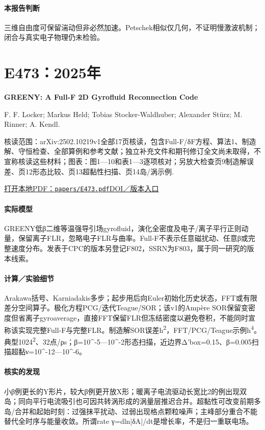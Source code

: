 \paragraph{本报告判断}三维自由度可保留湍动但非必然加速。Petschek相似仅几何，不证明慢激波机制；闭合与真实电子物理仍未检验。

\section{E473：2025年}\label{paper:E473}

\textbf{GREENY: A Full-F 2D Gyrofluid Reconnection Code}\citep{E473}\

F. F. Locker;  Markus Held;  Tobias Stocker-Waldhuber;  Alexander Stürz;  M. Rinner;  A. Kendl.

\textsf{核读范围：}arXiv:2502.10219v1全部17页核读，包含Full-F/δF方程、算法1、制造解、守恒检查、全部算例和参考文献；独立补充文件和期刊修订全文尚未取得，不宣称核读这些材料；\textsf{图表：}图1—10和表1—3逐项核对；另放大检查页9制造解误差、页12形态比较、页13超黏性扫描、页14岛/涡示例.

\href{run:papers/E473.pdf}{打开本地PDF：\texttt{papers/E473.pdf}}\quad\href{https://doi.org/10.1016/j.cpc.2025.109807}{DOI／版本入口}

\paragraph{实际模型}GREENY低β二维等温强导引场gyrofluid，演化全密度及电子/离子平行正则动量，保留离子FLR，忽略电子FLR与曲率。Full-F不表示任意磁扰动、任意β或完整速度分布。发表于CPC的版本另登记F802，SSRN为F803，属于同一研究的版本线索。

\paragraph{计算／实验细节}Arakawa括号、Karniadakis多步；起步用后向Euler初始化历史状态，FFT或有限差分空间算子。极化方程PCG/迭代Teague/SOR；该v1的Ampère SOR保留变密度但省离子gyroaverage，直接FFT保留FLR但冻结密度以避免卷积，不能同时宣称该实现完整Full-F与完整FLR。制造解SOR误差h\textsuperscript{2}，FFT/PCG/Teague示例h\textsuperscript{4}。典型1024\textsuperscript{2}、32点/ρs；β=10\textasciicircum{}-5—10\textasciicircum{}-2形态扫描，近边界Δ'box=0.15、β=0.005扫描超黏ν=10\textasciicircum{}-12—10\textasciicircum{}-6。

\paragraph{核实的发现}小β例更长的Y形片，较大β例更开放X形；暖离子电流驱动长宽比2的例出现双岛；同向平行电流吸引也可因共转涡形成的涡量层推迟合并。超黏性可改变前期多岛/合并和起始时刻：过强抹平扰动、过弱出现格点颗粒噪声；主峰部分重合不能替代全时序与能量收敛。所谓rate γ=dln|δA|/dt是增长率，不是归一重联电场。

